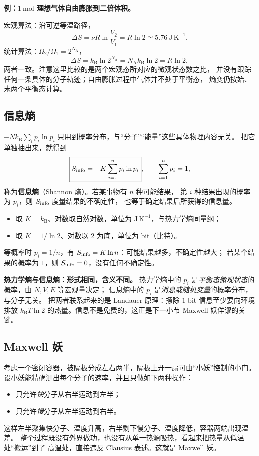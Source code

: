 \documentclass[11pt,a4paper,openany]{ctexbook}
\newcommand{\kb}{k_{\mathrm B}}
\begin{document}
\begin{examplebox}
\textbf{例：$1\ \mathrm{mol}$ 理想气体自由膨胀到二倍体积。}

宏观算法：沿可逆等温路径，
\[
\Delta S=\nu R\ln\frac{V_2}{V_1}=R\ln2
\simeq5.76\ \mathrm{J\,K^{-1}} .
\]
统计算法：$\Omega_2/\Omega_1=2^{N_{\mathrm A}}$，
\[
\Delta S=\kb\ln2^{N_{\mathrm A}}=N_{\mathrm A}\kb\ln2=R\ln2 ,
\]
两者一致。注意这里比较的是两个宏观态所对应的微观状态数之比，
并没有跟踪任何一条具体的分子轨迹；自由膨胀过程中气体并不处于平衡态，
熵变仍按始、末两个平衡态计算。
\end{examplebox}

\subsection*{信息熵}
$-N\kb\sum_ip_i\ln p_i$ 只用到概率分布，与“分子”“能量”这些具体物理内容无关。
把它单独抽出来，就得到
\[
\boxed{S_{\rm info}=-K\sum_{i=1}^{n}p_i\ln p_i},
\qquad \sum_{i=1}^{n}p_i=1,
\]
称为\textbf{信息熵}（Shannon 熵）。若某事物有 $n$ 种可能结果，
第 $i$ 种结果出现的概率为 $p_i$，则 $S_{\rm info}$ 度量结果的不确定性，
也等于确定结果后所获得的信息量。
\begin{itemize}[leftmargin=2.2em]
\item 取 $K=\kb$、对数取自然对数，单位为 $\mathrm{J\,K^{-1}}$，与热力学熵同量纲；
\item 取 $K=1/\ln2$、对数以 $2$ 为底，单位为 bit（比特）。
\end{itemize}
等概率时 $p_i=1/n$，有 $S_{\rm info}=K\ln n$：可能结果越多，不确定性越大；
若某个结果的概率为 $1$，则 $S_{\rm info}=0$，没有任何不确定性。

\begin{notebox}
\textbf{热力学熵与信息熵：形式相同，含义不同。}
热力学熵中的 $p_i$ 是\emph{平衡态微观状态}的概率，由 $N,V,E$ 等宏观量决定；
信息熵中的 $p_i$ 是\emph{消息或随机变量}的概率分布，与分子无关。
把两者联系起来的是 Landauer 原理：擦除 $1$ bit 信息至少要向环境排放
$\kb T\ln2$ 的热量。信息不是免费的，这正是下一小节 Maxwell 妖佯谬的关键。
\end{notebox}

\subsection*{Maxwell 妖}
考虑一个密闭容器，被隔板分成左右两半，隔板上开一扇可由“小妖”控制的小门。
设小妖能精确测出每个分子的速率，并且只做如下两种操作：
\begin{itemize}[leftmargin=2.2em]
\item 只允许\emph{快}分子从右半运动到左半；
\item 只允许\emph{慢}分子从左半运动到右半。
\end{itemize}
这样左半聚集快分子、温度升高，右半剩下慢分子、温度降低，容器两端出现温差。
整个过程既没有外界做功，也没有从单一热源吸热，看起来把热量从低温处“搬运”到了
高温处，直接违反 Clausius 表述。这就是 Maxwell 妖。
\end{document}
